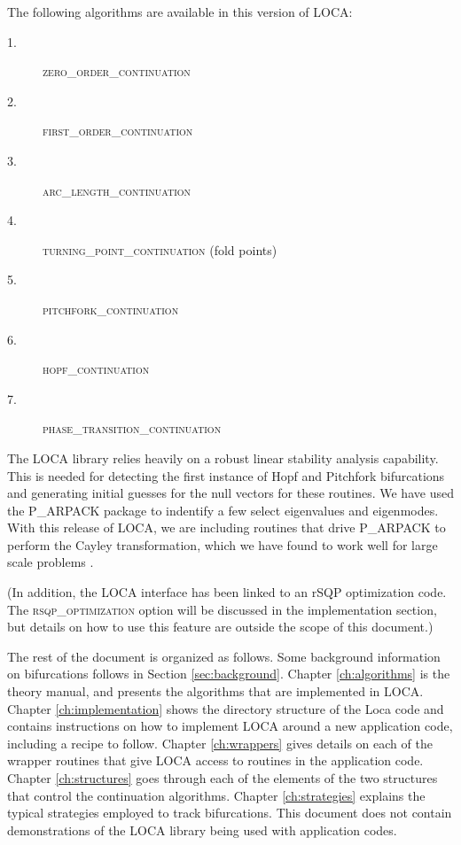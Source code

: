The following algorithms are available in this version of LOCA:
\begin{description} 
\item[1.] \textsc{zero\_order\_continuation }
\item[2.] \textsc{first\_order\_continuation }
\item[3.] \textsc{arc\_length\_continuation }
\item[4.] \textsc{turning\_point\_continuation } (fold points)
\item[5.] \textsc{pitchfork\_continuation }
\item[6.] \textsc{hopf\_continuation }
\item[7.] \textsc{phase\_transition\_continuation }
\end{description}
The LOCA library relies heavily on a robust linear stability analysis capability. This is needed for detecting the first instance of Hopf and Pitchfork bifurcations and generating initial guesses for the null vectors for these routines. We have used the P\_ARPACK package \cite{lehoucq98b}\cite{maschhoff96} to indentify a few select eigenvalues and eigenmodes. With this release of LOCA, we are including routines that drive P\_ARPACK to perform the Cayley transformation, which we have found to work well for large scale problems \cite{lehoucq01}\cite{Burroughs01}.

(In addition, the LOCA interface has been linked to an rSQP optimization code. The
\textsc{rsqp\_optimization} option will be discussed in the implementation section, but details on how to use this feature are outside the scope of this document.)

The rest of the document is organized as follows. Some background information on bifurcations follows in Section \ref{sec:background}. Chapter \ref{ch:algorithms}
is the theory manual, and presents the algorithms that are implemented in LOCA.
Chapter \ref{ch:implementation} shows the directory structure of the Loca code and contains instructions on how to implement LOCA around a new application code, including a recipe to follow. Chapter \ref{ch:wrappers} gives details on each of the wrapper routines that give LOCA access to routines in the application code. Chapter \ref{ch:structures} goes through each of the elements of the two structures that control the continuation algorithms. Chapter \ref{ch:strategies} explains the typical strategies employed to track bifurcations. This document does not contain demonstrations of the LOCA library being used with application codes.

